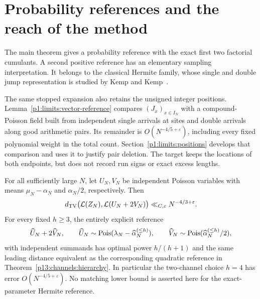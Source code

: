 \section{Probability references and the reach of the method}
\label{p1:discussion}

The main theorem gives a probability reference with the exact
first two factorial cumulants. A second positive reference has
an elementary sampling interpretation. It belongs to the classical
Hermite family, whose single and double jump representation is
studied by Kemp and Kemp~\cite{kempkemp1965}.

The same stopped expansion also retains the unsigned integer
positions. Lemma~\ref{p1:limits:vector-reference} compares
\((J_x)_{x\in I_N}\) with a compound-Poisson field built from
independent single arrivals at sites and double arrivals along
good arithmetic pairs. Its remainder is
\(O(N^{-4/5+\varepsilon})\), including every fixed
polynomial weight in the total count.
Section~\ref{p1:limits:positions} develops that comparison and
uses it to justify pair deletion. The target keeps the locations
of both endpoints, but does not record run signs or exact excess
lengths.

\begin{corollary}
\label{p1:cor:compound}
For all sufficiently large \(N\), let \(U_N,V_N\) be independent
Poisson variables with means \(\mu_N-\alpha_N\) and
\(\alpha_N/2\), respectively. Then
\[
 d_{\mathrm{TV}}\bigl(\mathcal L(Z_N),\mathcal L(U_N+2V_N)\bigr)
       \ll_{C,\varepsilon}N^{-4/3+\varepsilon}.
\]
For every fixed \(h\ge3\), the entirely explicit reference
\[
 \widehat U_N+2\widehat V_N,\qquad
 \widehat U_N\sim\operatorname{Pois}(\lambda_N-\widehat\alpha_N^{(\le h)}),\qquad
 \widehat V_N\sim\operatorname{Pois}(\widehat\alpha_N^{(\le h)}/2),
\]
with independent summands has optimal power \(h/(h+1)\)
and the same leading distance equivalent as the corresponding
quadratic reference in Theorem~\ref{p13:channels:hierarchy}.
In particular the two-channel choice \(h=4\) has
error \(O(N^{-4/5+\varepsilon})\).
No matching lower bound is asserted here for the
exact-parameter Hermite reference.
\end{corollary}

